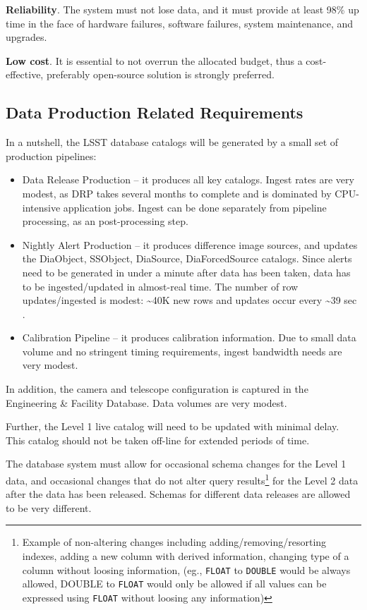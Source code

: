 \documentclass[DM,lsstdraft,toc]{lsstdoc}
\begin{document}
\textbf{Reliability}. The system must not lose data, and it must provide
at least 98\% up time in the face of hardware failures, software
failures, system maintenance, and upgrades.

\textbf{Low cost}. It is essential to not overrun the allocated budget,
thus a cost-effective, preferably open-source solution is strongly
preferred.

\subsection{Data Production Related
Requirements}\label{data-production-related-requirements}

In a nutshell, the LSST database catalogs will be generated by a small
set of production pipelines:

\begin{itemize}
\item
  Data Release Production -- it produces all key catalogs. Ingest rates
  are very modest, as DRP takes several months to complete and is
  dominated by CPU-intensive application jobs. Ingest can be done
  separately from pipeline processing, as an post-processing step.
\item
  Nightly Alert Production -- it produces difference image sources, and
  updates the DiaObject, SSObject, DiaSource, DiaForcedSource catalogs.
  Since alerts need to be generated in under a minute after data has
  been taken, data has to be ingested/updated in almost-real time. The
  number of row updates/ingested is modest: \textasciitilde{}40K new
  rows and updates occur every \textasciitilde{}39 sec \citep{2008ASPC..394..114B}.
\item
  Calibration Pipeline -- it produces calibration information. Due to
  small data volume and no stringent timing requirements, ingest
  bandwidth needs are very modest.
\end{itemize}

In addition, the camera and telescope configuration is captured in the
Engineering \& Facility Database. Data volumes are very modest.

Further, the Level 1 live catalog will need to be updated with minimal
delay. This catalog should not be taken off-line for extended periods of
time.

The database system must allow for occasional schema changes for the
Level 1 data, and occasional changes that do not alter query
results\footnote{Example of non-altering changes including
  adding/removing/resorting indexes, adding a new column with derived
  information, changing type of a column without loosing information,
  (eg., \texttt{FLOAT} to \texttt{DOUBLE} would be always allowed,
  DOUBLE to \texttt{FLOAT} would only be allowed if all values can be
  expressed using \texttt{FLOAT} without loosing any information)} for
the Level 2 data after the data has been released. Schemas for different
data releases are allowed to be very different.
\end{document}
